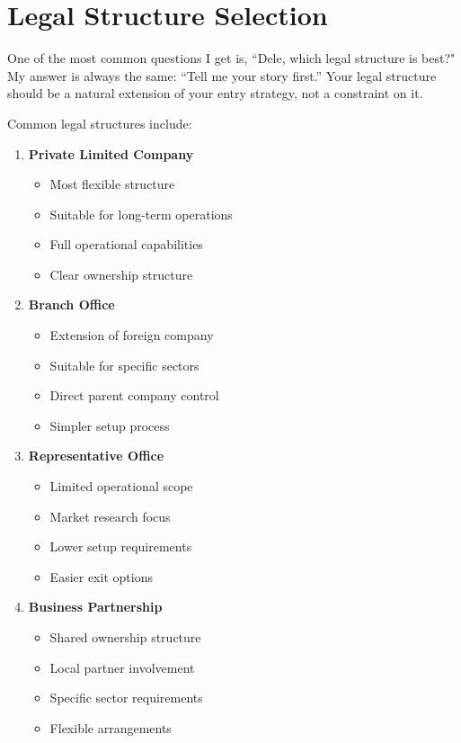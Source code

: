 \section{Legal Structure Selection}\label{sec:legal-structure-selection}

One of the most common questions I get is, ``Dele, which legal structure is best?" My answer is always the same: ``Tell me your story first.'' Your legal structure should be a natural extension of your entry strategy, not a constraint on it.

Common legal structures include:
\begin{enumerate}
    \item \textbf{Private Limited Company}
    \begin{itemize}
        \item Most flexible structure
        \item Suitable for long-term operations
        \item Full operational capabilities
        \item Clear ownership structure
    \end{itemize}
    \item \textbf{Branch Office}
    \begin{itemize}
        \item Extension of foreign company
        \item Suitable for specific sectors
        \item Direct parent company control
        \item Simpler setup process
    \end{itemize}
    \item \textbf{Representative Office}
    \begin{itemize}
        \item Limited operational scope
        \item Market research focus
        \item Lower setup requirements
        \item Easier exit options
    \end{itemize}
    \item \textbf{Business Partnership}
    \begin{itemize}
        \item Shared ownership structure
        \item Local partner involvement
        \item Specific sector requirements
        \item Flexible arrangements
    \end{itemize}
\end{enumerate}

